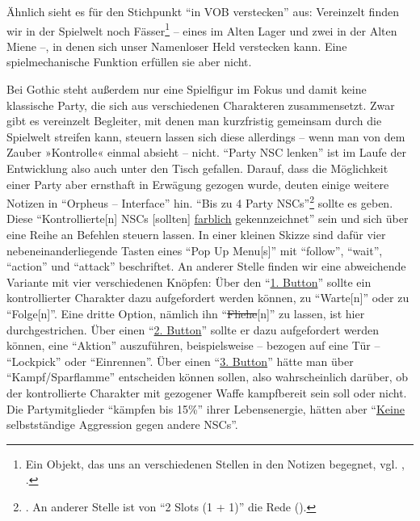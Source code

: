 \documentclass[12pt]{scrbook}
\begin{document}
Ähnlich sieht es für den Stichpunkt \enquote{in VOB verstecken} aus:
Vereinzelt finden wir in der Spielwelt noch Fässer\footnote{Ein Objekt, das uns an verschiedenen Stellen in den Notizen begegnet, vgl. \autocite[S.~19]{orpheus_b_scribbles}, \autocite[S.~6]{orpheus_interface}.} -- eines im Alten Lager und zwei in der Alten Miene --, in denen sich unser Namenloser Held verstecken kann.
Eine spielmechanische Funktion erfüllen sie aber nicht.

Bei Gothic steht außerdem nur eine Spielfigur im Fokus und damit keine klassische Party, die sich aus verschiedenen Charakteren zusammensetzt.
Zwar gibt es vereinzelt Begleiter, mit denen man kurzfristig gemeinsam durch die Spielwelt streifen kann, steuern lassen sich diese allerdings -- wenn man von dem Zauber »Kontrolle« einmal absieht -- nicht. %
\enquote{Party NSC lenken} ist im Laufe der Entwicklung also auch unter den Tisch gefallen.
Darauf, dass die Möglichkeit einer Party aber ernsthaft in Erwägung gezogen wurde, deuten einige weitere Notizen in \enquote{Orpheus -- Interface} hin.
\enquote{Bis zu 4 Party NSCs}\footnote{\autocite[S.~5]{orpheus_interface}. An anderer Stelle ist von \enquote{2 Slots (1 + 1)} die Rede (\autocite[S.~7]{orpheus_b_scribbles}).} sollte es geben.
Diese \enquote{Kontrollierte[n] NSCs [sollten] \uline{farblich} gekennzeichnet}\autocite[S.~5]{orpheus_interface} sein und sich über eine Reihe an Befehlen steuern lassen.
In einer kleinen Skizze sind dafür vier nebeneinanderliegende Tasten eines \enquote{Pop Up Menu[s]} mit \enquote{follow}, \enquote{wait}, \enquote{action} und \enquote{attack} beschriftet.\autocite[S.~3]{orpheus_interface}
An anderer Stelle finden wir eine abweichende Variante mit vier verschiedenen Knöpfen:
Über den \enquote{\uline{1. Button}} sollte ein kontrollierter Charakter dazu aufgefordert werden können, zu \enquote{Warte[n]} oder zu \enquote{Folge[n]}.
Eine dritte Option, nämlich ihn \enquote{\sout{Fliehe}[n]} zu lassen, ist hier durchgestrichen.
Über einen \enquote{\uline{2. Button}} sollte er dazu aufgefordert werden können, eine \enquote{Aktion} auszuführen, beispielsweise -- bezogen auf eine Tür -- \enquote{Lockpick} oder \enquote{Einrennen}.
Über einen \enquote{\uline{3. Button}} hätte man über \enquote{Kampf/Sparflamme} entscheiden können sollen, also wahrscheinlich darüber, ob der kontrollierte Charakter mit gezogener Waffe kampfbereit sein soll oder nicht.
Die Partymitglieder \enquote{kämpfen bis 15\%} ihrer Lebensenergie, hätten aber \enquote{\uline{Keine} selbstständige Aggression gegen andere NSCs}.
\end{document}
